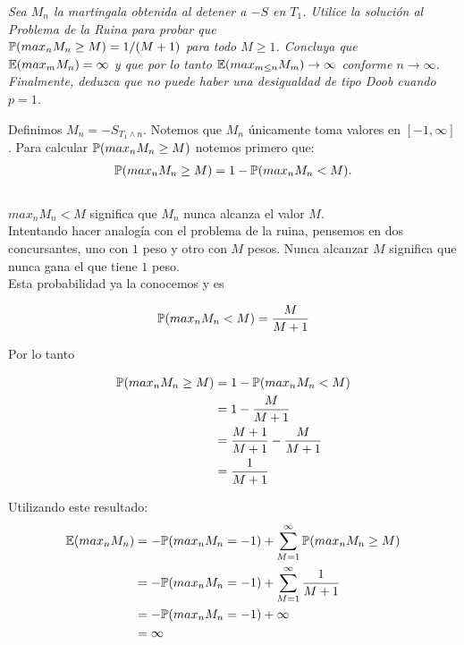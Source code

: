 \emph{
	Sea $M_n$ la martingala obtenida al detener a $-S$ en $T_1$. Utilice la solución al
	Problema de la Ruina para probar que \\
	$\mathbb{P}(max_n M_n \geq M) = 1/(M+1)$ para todo $M \geq 1$. Concluya que\\
	$\mathbb{E}(max_m M_n) = \infty$ y que por lo tanto $\mathbb{E}(max_{m\leq n} M_m) \rightarrow \infty$ conforme 
	$n \rightarrow \infty$. Finalmente, deduzca que no puede haber una desigualdad de tipo Doob cuando $p=1$.\\
}	

	Definimos $M_n = -S_{T_1 \wedge n}$. Notemos que $M_n$ únicamente toma valores en $[-1, \infty]$.
	Para calcular $\mathbb{P}(max_n M_n \geq M)$ notemos primero que:
	\begin{align}
		\mathbb{P}(max_n M_n \geq M) = 1 - \mathbb{P}(max_n M_n < M).
	\end{align}\\
	
	$max_n M_n < M$ significa que $M_n$ nunca alcanza el valor $M$.\\
	 
	Intentando hacer analogía con el problema de la ruina, pensemos en dos concursantes,
	uno con $1$ peso y otro con $M$ pesos. Nunca alcanzar $M$ significa que nunca gana el que tiene $1$ peso.\\
	
	Esta probabilidad ya la conocemos y es 
	
	\begin{align}
		\mathbb{P}(max_n M_n < M) = \frac{M}{M + 1}
	\end{align}
		
	Por lo tanto
	
	\begin{align}
		\mathbb{P}(max_n M_n \geq M) 	&= 1 - \mathbb{P}(max_n M_n < M) \\
								&= 1 - \frac{M}{M + 1}\\
								&= \frac{M+1}{M+1} - \frac{M}{M + 1}\\
								&= \frac{1}{M+1}
	\end{align}
	
	Utilizando este resultado:
	\begin{align} \label{problema1_3:esperanza_del_maximo_de_M_n}
		\mathbb{E}(max_n M_n) 	&= - \mathbb{P}(max_n M_n = -1) + \sum_{M=1}^{\infty} \mathbb{P}(max_n M_n \geq M) \\
						&= - \mathbb{P}(max_n M_n = -1) + \sum_{M=1}^{\infty} \frac{1}{M+1} \\ 
						&= - \mathbb{P}(max_n M_n = -1) + \infty \\
						&= \infty
	\end{align}						
	
